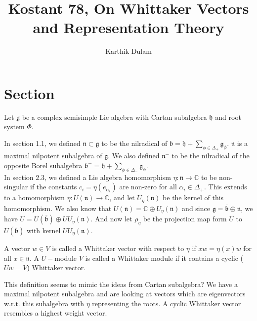 \documentclass{article}
\title{Kostant 78, On Whittaker Vectors and Representation Theory}
\author{Karthik Dulam}
\theoremstyle{mytheoremstyle}
\theoremstyle{mytheoremstyle}
\theoremstyle{myproblemstyle}
\begin{document}
    \maketitle
    \listoftodos


\section{Section}
    
    Let $\mathfrak g$ be a complex semisimple Lie algebra with Cartan subalgebra $\mathfrak h$ and root system $\Phi$.

    In section 1.1, we defined $\mathfrak n \subset \mathfrak g$ to be the nilradical of 
    $\mathfrak b = \mathfrak h + \sum_{\phi \in \Delta_+} \mathfrak g_\phi$. $\mathfrak n$ is a maximal nilpotent subalgebra 
    of $\mathfrak g$. We also defined $\mathfrak n^-$ to be the nilradical of the opposite Borel subalgebra 
    $\mathfrak b^- = \mathfrak h + \sum_{\phi \in \Delta_-} \mathfrak g_\phi$. \\

    In section 2.3, we defined a Lie algebra homomorphism $\eta: \mathfrak n \to \mathbb C$ to be non-singular if 
    the constants $c_i = \eta(e_{\alpha_i})$ are non-zero for all $\alpha_i \in \Delta_+$. This extends to a homomorphism 
    $\eta: U(\mathfrak n) \to \mathbb C$, and let $U_\eta(\mathfrak n)$ be the kernel of this homomorphism. 
    We also know that $U(\mathfrak n) = \mathbb C \oplus U_\eta(\mathfrak n)$ and since $\mathfrak g = \overline{\mathfrak b} \oplus \mathfrak n$,
    we have $U = U(\overline{\mathfrak b}) \oplus U U_\eta(\mathfrak n)$. And now let $\rho_\eta$ be the projection map
    form $U$ to $U(\overline{\mathfrak b})$ with kernel $UU_\eta(\mathfrak n)$.


    \begin{definition}
	A vector $w \in V$ is called a Whittaker vector with respect to $\eta$ if $xw = \eta(x)w$ for all $x \in \mathfrak n$.
	A $U-$module $V$ is called a Whittaker module if it contains a cyclic ($Uw = V$) Whittaker vector.
    \end{definition}

    \begin{remark}
	This definition seems to mimic the ideas from Cartan subalgebra? We have a maximal nilpotent subalgebra and are looking 
	at vectors which are eigenvectors w.r.t. this subalgebra with $\eta$ representing the roots.
	A cyclic Whittaker vector resembles a highest weight vector.
    \end{remark}
    
\end{document}
